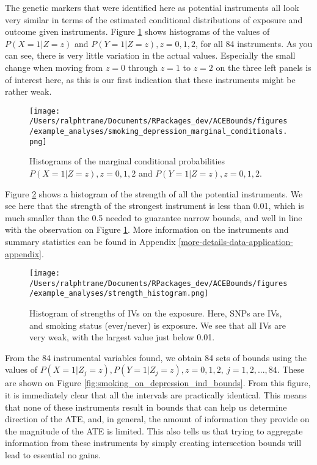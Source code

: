 \documentclass[
]{article}
\theoremstyle{plain}
\begin{document}
The genetic markers that were identified here as potential instruments all look very similar in terms of the estimated conditional distributions of exposure and outcome given instruments. Figure \ref{fig:smoking_on_depression_marginals} shows histograms of the values of \(P(X = 1|Z = z)\) and \(P(Y = 1|Z = z), z = 0,1,2\), for all 84 instruments. As you can see, there is very little variation in the actual values. Especially the small change when moving from \(z = 0\) through \(z = 1\) to \(z = 2\) on the three left panels is of interest here, as this is our first indication that these instruments might be rather weak.

\begin{figure}[H]
  \texttt{[image: /Users/ralphtrane/Documents/RPackages\_dev/ACEBounds/figures/example\_analyses/smoking\_depression\_marginal\_conditionals.png]}
  \caption{Histograms of the marginal conditional probabilities $P(X = 1 | Z = z), z = 0,1,2$ and $P(Y = 1 | Z = z), z=0,1,2$.}
  \label{fig:smoking_on_depression_marginals}
\end{figure}

Figure \ref{fig:strength_histogram} shows a histogram of the strength of all the potential instruments. We see here that the strength of the strongest instrument is less than 0.01, which is much smaller than the 0.5 needed to guarantee narrow bounds, and well in line with the observation on Figure \ref{fig:smoking_on_depression_marginals}. More information on the instruments and summary statistics can be found in Appendix \ref{more-details-data-application-appendix}.

\begin{figure}[H]
  \center
  \texttt{[image: /Users/ralphtrane/Documents/RPackages\_dev/ACEBounds/figures/example\_analyses/strength\_histogram.png]}
  \caption{Histogram of strengths of IVs on the exposure. Here, SNPs are IVs, and smoking status (ever/never) is exposure. We see that all IVs are very weak, with the largest value just below 0.01.}
  \label{fig:strength_histogram}
\end{figure}

From the 84 instrumental variables found, we obtain 84 sets of bounds using the values of \(P(X = 1 | Z_j = z), P(Y = 1 | Z_j = z), z = 0,1,2,\ j=1,2,...,84\). These are shown on Figure \ref{fig:smoking_on_depression_ind_bounds}. From this figure, it is immediately clear that all the intervals are practically identical. This means that none of these instruments result in bounds that can help us determine direction of the ATE, and, in general, the amount of information they provide on the magnitude of the ATE is limited. This also tells us that trying to aggregate information from these instruments by simply creating intersection bounds will lead to essential no gains.
\end{document}
